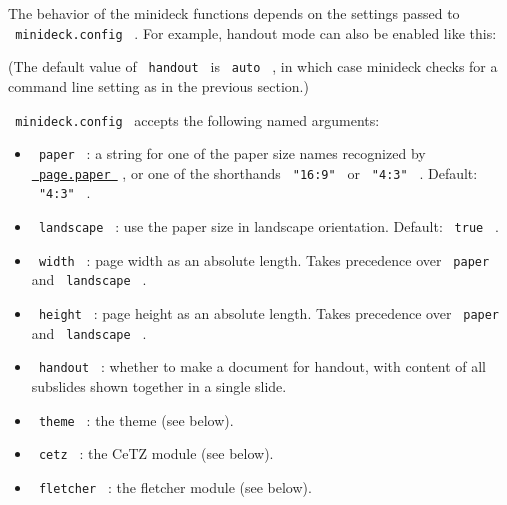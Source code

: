 The behavior of the minideck functions depends on the settings passed to
\texttt{\ minideck.config\ } . For example, handout mode can also be
enabled like this:

\begin{Shaded}
\begin{Highlighting}[]


\NormalTok{\#slide[}
  


\NormalTok{]}
\end{Highlighting}
\end{Shaded}

(The default value of \texttt{\ handout\ } is \texttt{\ auto\ } , in
which case minideck checks for a command line setting as in the previous
section.)

\texttt{\ minideck.config\ } accepts the following named arguments:

\begin{itemize}
\tightlist
\item
  \texttt{\ paper\ } : a string for one of the paper size names
  recognized by
  \href{https://typst.app/docs/reference/layout/page/\#parameters-paper}{\texttt{\ page.paper\ }}
  , or one of the shorthands \texttt{\ "16:9"\ } or \texttt{\ "4:3"\ } .
  Default: \texttt{\ "4:3"\ } .
\item
  \texttt{\ landscape\ } : use the paper size in landscape orientation.
  Default: \texttt{\ true\ } .
\item
  \texttt{\ width\ } : page width as an absolute length. Takes
  precedence over \texttt{\ paper\ } and \texttt{\ landscape\ } .
\item
  \texttt{\ height\ } : page height as an absolute length. Takes
  precedence over \texttt{\ paper\ } and \texttt{\ landscape\ } .
\item
  \texttt{\ handout\ } : whether to make a document for handout, with
  content of all subslides shown together in a single slide.
\item
  \texttt{\ theme\ } : the theme (see below).
\item
  \texttt{\ cetz\ } : the CeTZ module (see below).
\item
  \texttt{\ fletcher\ } : the fletcher module (see below).
\end{itemize}

